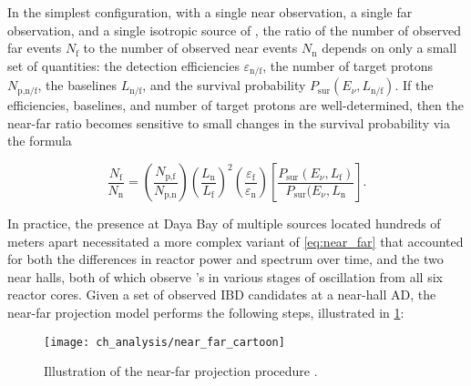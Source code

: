 In the simplest configuration, with a single near observation,
a single far observation, and a single isotropic source of \nuebar,
the ratio of the number of observed far events $N_\text{f}$
to the number of observed near events $N_\text{n}$
depends on only a small set of quantities:
the detection efficiencies $\varepsilon_\text{n/f}$,
the number of target protons $N_\text{p,n/f}$,
the baselines $L_\text{n/f}$,
and the survival probability $P_\text{sur}(E_\nu, L_\text{n/f})$.
If the efficiencies, baselines, and number of target protons are well-determined,
then the near-far ratio becomes sensitive
to small changes in the survival probability via the formula \cite{ngd2016}

\begin{equation}\label{eq:near_far}
    \frac{N_\text{f}}{N_\text{n}} = \left(\frac{N_\text{p,f}}{N_\text{p,n}}\right)
    \left(\frac{L_\text{n}}{L_\text{f}}\right)^2
    \left(\frac{\varepsilon_\text{f}}{\varepsilon_\text{n}}\right)
    \left[\frac{P_\text{sur}(E_\nu, L_\text{f})}{P_\text{sur}(E_\nu, L_\text{n}}\right].
\end{equation}

In practice, the presence at Daya Bay of multiple \nuebar{} sources
located hundreds of meters apart
necessitated a more complex variant of \cref{eq:near_far}
that accounted for both the differences in reactor power and \nuebar{} spectrum over time,
and the two near halls, both of which observe \nuebar{}'s
in various stages of oscillation from all six reactor cores.
Given a set of observed IBD candidates at a near-hall AD,
the near-far projection model performs the following steps,
illustrated in \cref{fig:near_far_cartoon}:

\begin{figure}
    \centering
    \texttt{[image: ch\_analysis/near\_far\_cartoon]}
    \caption[Diagram of near-to-far projection]{Illustration of the near-far projection procedure \cite{p12e_fitter}.}
    \label{fig:near_far_cartoon}
\end{figure}

